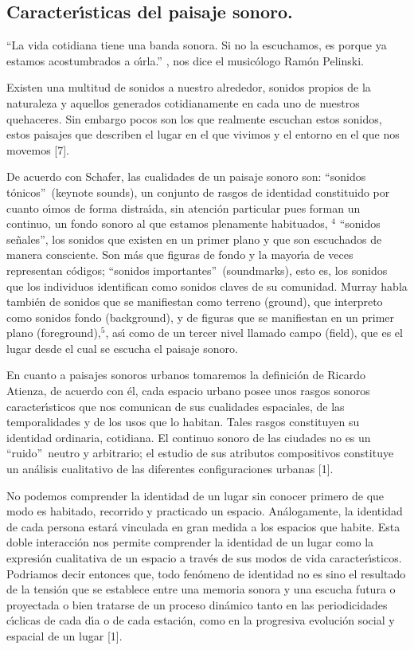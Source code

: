 \subsection{Caracter\'{\i}sticas del paisaje sonoro.}

\textquotedblleft La vida cotidiana tiene una banda sonora. Si no la
escuchamos, es porque ya estamos acostumbrados a o\'{\i}rla.\textquotedblright%
, nos dice el music\'{o}logo Ram\'{o}n Pelinski.

Existen una multitud de sonidos a nuestro alrededor, sonidos propios de la
naturaleza y aquellos generados cotidianamente en cada uno de nuestros
quehaceres. Sin embargo pocos son los que realmente escuchan estos sonidos,
estos paisajes que describen el lugar en el que vivimos y el entorno en el que
nos movemos [7].

De acuerdo con Schafer, las cualidades de un paisaje sonoro son:
\textquotedblleft sonidos t\'{o}nicos\textquotedblright\ (keynote sounds), un
conjunto de rasgos de identidad constituido por cuanto o\'{\i}mos de forma
distra\'{\i}da, sin atenci\'{o}n particular pues forman un continuo, un fondo
sonoro al que estamos plenamente habituados, $^{4}$ \textquotedblleft sonidos
se\~{n}ales\textquotedblright, los sonidos que existen en un primer plano y
que son escuchados de manera consciente. Son m\'{a}s que figuras de fondo y la
mayor\'{\i}a de veces representan c\'{o}digos; \textquotedblleft sonidos
importantes\textquotedblright\ (soundmarks), esto es, los sonidos que los
individuos identifican como sonidos claves de su comunidad. Murray habla
tambi\'{e}n de sonidos que se manifiestan como terreno (ground), que
interpreto como sonidos fondo (background), y de figuras que se manifiestan en
un primer plano (foreground),$^{5}$, as\'{\i} como de un tercer nivel llamado
campo (field), que es el lugar desde el cual se escucha el paisaje sonoro.

En cuanto a paisajes sonoros urbanos tomaremos la definici\'{o}n de Ricardo
Atienza, de acuerdo con \'{e}l, cada espacio urbano posee unos rasgos sonoros
caracter\'{\i}sticos que nos comunican de sus cualidades espaciales, de las
temporalidades y de los usos que lo habitan. Tales rasgos constituyen su
identidad ordinaria, cotidiana. El continuo sonoro de las ciudades no es un
\textquotedblleft ruido\textquotedblright\ neutro y arbitrario; el estudio de
sus atributos compositivos constituye un an\'{a}lisis cualitativo de las
diferentes configuraciones urbanas [1].

No podemos comprender la identidad de un lugar sin conocer primero de que modo
es habitado, recorrido y practicado un espacio. An\'{a}logamente, la identidad
de cada persona estar\'{a} vinculada en gran medida a los espacios que habite.
Esta doble interacci\'{o}n nos permite comprender la identidad de un lugar
como la expresi\'{o}n cualitativa de un espacio a trav\'{e}s de sus modos de
vida caracter\'{\i}sticos. Podriamos decir entonces que, todo fen\'{o}meno de
identidad no es sino el resultado de la tensi\'{o}n que se establece entre una
memoria sonora y una escucha futura o proyectada o bien tratarse de un proceso
din\'{a}mico tanto en las periodicidades c\'{\i}clicas de cada d\'{\i}a o de
cada estaci\'{o}n, como en la progresiva evoluci\'{o}n social y espacial de un
lugar [1].

